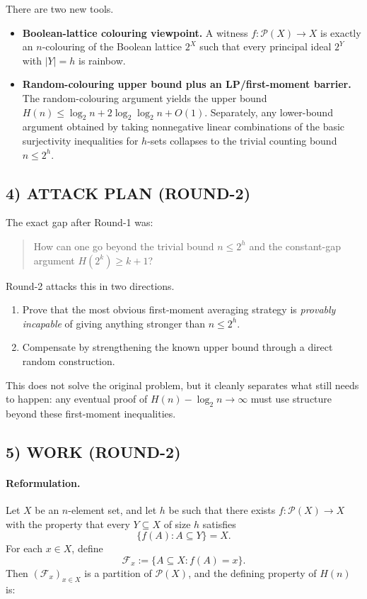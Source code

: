 There are two new tools.

\begin{itemize}
\item \textbf{Boolean-lattice colouring viewpoint.}
A witness $f:\mathcal P(X)\to X$ is exactly an $n$-colouring of the Boolean lattice $2^X$ such that
every principal ideal $2^Y$ with $|Y|=h$ is rainbow.

\item \textbf{Random-colouring upper bound plus an LP/first-moment barrier.}
The random-colouring argument yields the upper bound
$H(n)\le \log_2 n + 2\log_2\log_2 n + O(1)$.
Separately, any lower-bound argument obtained by taking nonnegative linear combinations of the basic
surjectivity inequalities for $h$-sets collapses to the trivial counting bound $n\le 2^h$.
\end{itemize}

\subsection*{4) ATTACK PLAN (ROUND-2)}

The exact gap after Round-1 was:

\begin{quote}
How can one go beyond the trivial bound $n\le 2^h$ and the constant-gap argument $H(2^k)\ge k+1$?
\end{quote}

Round-2 attacks this in two directions.

\begin{enumerate}
\item Prove that the most obvious first-moment averaging strategy is \emph{provably incapable}
of giving anything stronger than $n\le 2^h$.
\item Compensate by strengthening the known upper bound through a direct random construction.
\end{enumerate}

This does not solve the original problem, but it cleanly separates what still needs to happen:
any eventual proof of $H(n)-\log_2 n\to\infty$ must use structure beyond these first-moment inequalities.

\subsection*{5) WORK (ROUND-2)}

\paragraph{Reformulation.}
Let $X$ be an $n$-element set, and let $h$ be such that there exists
$f:\mathcal P(X)\to X$ with the property that every $Y\subseteq X$ of size $h$ satisfies
\[
\{f(A):A\subseteq Y\}=X.
\]
For each $x\in X$, define
\[
\mathcal F_x:=\{A\subseteq X:f(A)=x\}.
\]
Then $(\mathcal F_x)_{x\in X}$ is a partition of $\mathcal P(X)$, and the defining property of $H(n)$ is:

